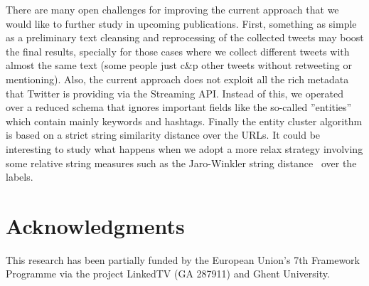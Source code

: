\documentclass{sig-alternate}
\begin{document}
There are many open challenges for improving the current approach that we would like to further study in upcoming publications. First, something as simple as a preliminary text cleansing and reprocessing of the collected tweets may boost the final results, specially for those cases where we collect different tweets with almost the same text (some people just c\&p other tweets without retweeting or mentioning). Also, the current approach does not exploit all the rich metadata that Twitter is providing via the Streaming API. Instead of this, we operated over a reduced schema that ignores important fields like the so-called ''entities'' which contain mainly keywords and hashtags. Finally the entity cluster algorithm is based on a strict string similarity distance over the URLs. It could be interesting to study what happens when we adopt a more relax strategy involving some relative string measures such as the Jaro-Winkler string distance~\cite{winkler2006overview} over the labels. 

\section*{Acknowledgments}
This research has been partially funded by the European Union's 7th Framework Programme via the project LinkedTV (GA 287911) and Ghent University.



\end{document}
